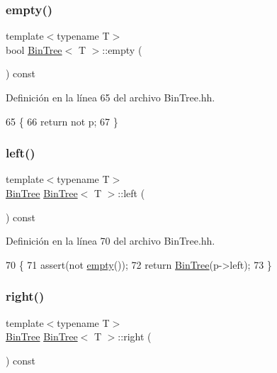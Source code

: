 \subsubsection{\texorpdfstring{empty()}{empty()}}
{\footnotesize\ttfamily template$<$typename T$>$ \\
bool \mbox{\hyperlink{class_bin_tree}{Bin\+Tree}}$<$ T $>$\+::empty (\begin{DoxyParamCaption}{ }\end{DoxyParamCaption}) const}



Definición en la línea 65 del archivo Bin\+Tree.\+hh.


\begin{DoxyCode}
65                         \{
66         \textcolor{keywordflow}{return} not p;
67     \}
\end{DoxyCode}
\mbox{\label{class_bin_tree_a82108db4c1b08d1f111027788c196d4e}} 
\subsubsection{\texorpdfstring{left()}{left()}}
{\footnotesize\ttfamily template$<$typename T$>$ \\
\mbox{\hyperlink{class_bin_tree}{Bin\+Tree}} \mbox{\hyperlink{class_bin_tree}{Bin\+Tree}}$<$ T $>$\+::left (\begin{DoxyParamCaption}{ }\end{DoxyParamCaption}) const}



Definición en la línea 70 del archivo Bin\+Tree.\+hh.


\begin{DoxyCode}
70                           \{
71         assert(not \mbox{\hyperlink{class_bin_tree_a74cda259ba5c25b8ee38ed4dc33e4fad}{empty}}());
72         \textcolor{keywordflow}{return} \mbox{\hyperlink{class_bin_tree_a47eef22d29cd023449d97c073c08e5b6}{BinTree}}(p->left);
73     \}
\end{DoxyCode}
\mbox{\label{class_bin_tree_aff8e96651b27284c329667b5ad3e4d0b}} 
\subsubsection{\texorpdfstring{right()}{right()}}
{\footnotesize\ttfamily template$<$typename T$>$ \\
\mbox{\hyperlink{class_bin_tree}{Bin\+Tree}} \mbox{\hyperlink{class_bin_tree}{Bin\+Tree}}$<$ T $>$\+::right (\begin{DoxyParamCaption}{ }\end{DoxyParamCaption}) const}



